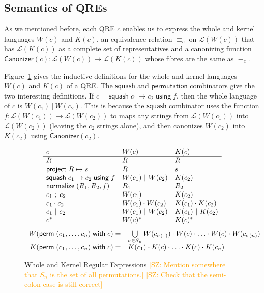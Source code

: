 \documentclass[acmsmall,review,anonymous]{acmart}
\newcommand{\FINISH}[3]{\ifdraft\textcolor{#1}{[#2: #3]}\fi}
\newcommand{\saz}[1]{\FINISH{orange}{SZ}{#1}}
\newcommand{\kw}[1]{\ensuremath{\mathsf{#1}}}
\newcommand{\project}[2]{\ensuremath{\kw{project} \; #1 \mapsto #2}}
\newcommand{\squash}[3]{\ensuremath{\kw{squash} \; #1 \rightarrow #2\; \kw{using} \; #3}}
\newcommand{\perm}[2]{\ensuremath{\kw{perm}\; (#1)\; \kw{with}\; #2}}
\newcommand{\normalize}[3]{\ensuremath{\kw{normalize} \; (#1, #2, #3)}}
\newcommand{\sep}{\ensuremath{\ | \ }}
\newcommand{\canonizer}{\ensuremath{\kw{Canonizer}}}
\newcommand{\eqrel}[1]{\ensuremath{\equiv_{#1}}}
\begin{document}
\subsection{Semantics of QREs}
As we mentioned before, each QRE $c$ enables us to express the whole and kernel
languages $W(c)$ and $K(c)$, an equivalence relation $\eqrel{c}$ on
$\mathcal{L}(W(c))$ that has $\mathcal{L}(K(c))$ as a complete set of
representatives and a canonizing function $\canonizer(c):\mathcal{L}(W(c))
\longrightarrow \mathcal{L}(K(c))$ whose fibres are the same as $\eqrel{c}$.


Figure~\ref{fig:wk} gives the inductive definitions for the whole and
kernel languages $W(c)$ and $K(c)$ of a QRE.
The \kw{squash} and \kw{permutation} combinators give the two interesting
definitions. If $c = \squash{c_1}{c_2}{f}$, then the whole language of $c$ is
$W(c_1) \sep W(c_2)$. This is because the \kw{squash} combinator uses the
function $f : \mathcal{L}(W(c_1)) \longrightarrow \mathcal{L}(W(c_2))$ to maps
any strings from $\mathcal{L}(W(c_1))$ into $\mathcal{L}(W(c_2))$ (leaving the
$c_2$ strings alone), and then canonizes $W(c_2)$ into $K(c_2)$ using
$\canonizer(c_2)$.


\begin{figure}[t]
\centering
\[
\begin{array}{l@{\quad}l@{\quad}l}

c & W(c) & K(c) \\ \hline
R & R & R \\
\project{R}{s} & R & s \\
\squash{c_1}{c_2}{f} & W(c_1) \sep W(c_2) & K(c_2) \\
\normalize{R_1}{R_2}{f} & R_1 & R_2 \\
c_1 \; ; \; c_2 & W(c_1) & K(c_2) \\
c_1 \cdot c_2 & W(c_1) \cdot W(c_2) & K(c_1) \cdot K(c_2) \\
c_1 \sep c_2 & W(c_1) \sep W(c_2) & K(c_1) \sep K(c_2) \\
c^* & W(c)^* & K(c)^* \\
\end{array}
\]
\[
\begin{array}{r@{\quad}l}
W( \perm{c_1, \ldots, c_n}{c} ) = &
\bigcup \limits_{\sigma \in S_n} W(c_{\sigma(1)}) \cdot W(c) \cdot \ldots \cdot
W(c) \cdot W(c_{\sigma(n)})\\
K( \perm{c_1, \ldots, c_n}{c} ) = & K(c_1) \cdot K(c) \cdot \ldots \cdot K(c)
\cdot K(c_n)
\end{array}
\]
\caption{Whole and Kernel Regular Expressions \saz{Mention somewhere that $S_n$
    is the set of all permutations.} \saz{Check that the semi-colon
    case is still correct}}
\label{fig:wk}
\end{figure}
\end{document}
